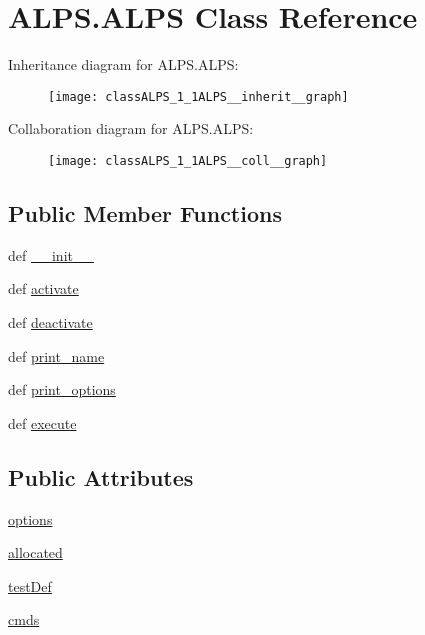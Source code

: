 \hypertarget{classALPS_1_1ALPS}{\section{A\-L\-P\-S.\-A\-L\-P\-S Class Reference}
\label{classALPS_1_1ALPS}
}


Inheritance diagram for A\-L\-P\-S.\-A\-L\-P\-S\-:\nopagebreak
\begin{figure}[H]
\begin{center}
\leavevmode
\texttt{[image: classALPS\_1\_1ALPS\_\_inherit\_\_graph]}
\end{center}
\end{figure}


Collaboration diagram for A\-L\-P\-S.\-A\-L\-P\-S\-:\nopagebreak
\begin{figure}[H]
\begin{center}
\leavevmode
\texttt{[image: classALPS\_1\_1ALPS\_\_coll\_\_graph]}
\end{center}
\end{figure}
\subsection*{Public Member Functions}
\begin{DoxyCompactItemize}
\item 
def \hyperlink{classALPS_1_1ALPS_a45417f6290435c66b3f3b7c4586915d9}{\-\_\-\-\_\-init\-\_\-\-\_\-}
\item 
def \hyperlink{classALPS_1_1ALPS_a3d507bd3feb505c8ed1b4e8f3729d636}{activate}
\item 
def \hyperlink{classALPS_1_1ALPS_aa1d63291a23bcca8ccbd44dc4d0fa6bf}{deactivate}
\item 
def \hyperlink{classALPS_1_1ALPS_a97e56ee7f5faaea26121d6ee0deeddab}{print\-\_\-name}
\item 
def \hyperlink{classALPS_1_1ALPS_a68c17d876ad850e44d40aa082b674f4e}{print\-\_\-options}
\item 
def \hyperlink{classALPS_1_1ALPS_af4b8efc64ea3abc5fb21fb93bfe052ff}{execute}
\end{DoxyCompactItemize}
\subsection*{Public Attributes}
\begin{DoxyCompactItemize}
\item 
\hyperlink{classALPS_1_1ALPS_a24dfa9b508f507c4cb6148f10a081555}{options}
\item 
\hyperlink{classALPS_1_1ALPS_ac371dce53e8c120f7031259025562bdb}{allocated}
\item 
\hyperlink{classALPS_1_1ALPS_a839c4f84a46683221d51004c08345ff2}{test\-Def}
\item 
\hyperlink{classALPS_1_1ALPS_a64bae95ba692ef4df06f716692b50ee9}{cmds}
\end{DoxyCompactItemize}


